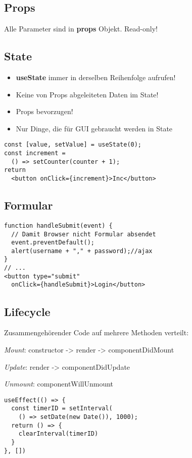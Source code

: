 \begin{multicols*}{4}
\subsection{Props}
Alle Parameter sind in \textbf{props} Objekt. Read-only!

\subsection{State}
\begin{itemize}
    \item \textbf{useState} immer in derselben Reihenfolge aufrufen!
    \item Keine von Props abgeleiteten Daten im State!
    \item Props bevorzugen!
    \item Nur Dinge, die für GUI gebraucht werden in State
\end{itemize}

\begin{verbatim}
const [value, setValue] = useState(0);
const increment =
  () => setCounter(counter + 1);
return
  <button onClick={increment}>Inc</button>
\end{verbatim}

\subsection{Formular}
\begin{verbatim}
function handleSubmit(event) {
  // Damit Browser nicht Formular absendet
  event.preventDefault();
  alert(username + "," + password);//ajax
}
// ...
<button type="submit"
  onClick={handleSubmit}>Login</button>
\end{verbatim}

\subsection{Lifecycle}
Zusammengehörender Code auf mehrere Methoden verteilt:

\textit{Mount}: constructor -> render -> componentDidMount

\textit{Update}: render -> componentDidUpdate

\textit{Unmount}: componentWillUnmount

\begin{verbatim}
useEffect(() => {
  const timerID = setInterval(
    () => setDate(new Date()), 1000);
  return () => {
    clearInterval(timerID)
  }
}, [])
\end{verbatim}


\end{multicols*}
